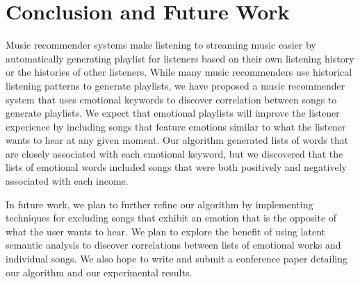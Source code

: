 \documentclass[10pt,twocolumn]{article}
\begin{document}
\section{Conclusion and Future Work}
Music recommender systems make listening to streaming music easier by automatically generating playlist for listeners based on their own listening history or the histories of other listeners.  While many music recommenders use historical listening patterns to generate playlists, we have proposed a music recommender system that uses emotional keywords to discover correlation between songs to generate playlists.  We expect that emotional playlists will improve the listener experience by including songs that feature emotions similar to what the listener wants to hear at any given moment.  Our algorithm generated lists of words that are closely associated with each emotional keyword, but we discovered that the lists of emotional words included songs that were both positively and negatively associated with each income.

In future work, we plan to further refine our algorithm by implementing techniques for excluding songs that exhibit an emotion that is the opposite of what the user wants to hear.  We plan to explore the benefit of using latent semantic analysis to discover correlations between lists of emotional works and individual songs.  We also hope to write and submit a conference paper detailing our algorithm and our experimental results.




\end{document}
